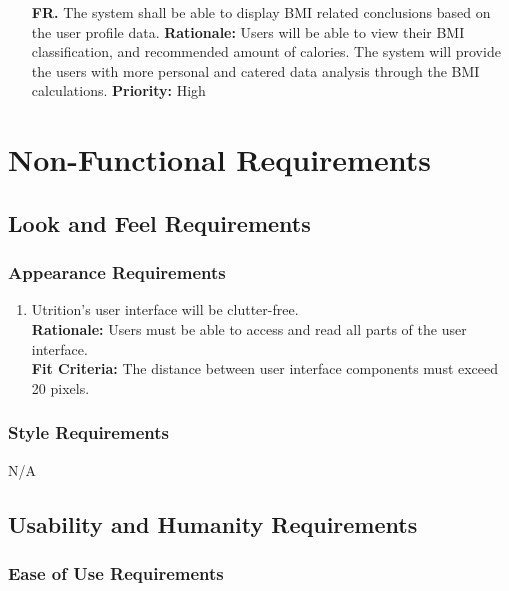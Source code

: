 \documentclass[12pt]{article}
\newcounter{FRCounter}
\newcommand{\FillFRNumber}{\textbf{FR\arabic{FRCounter}.} \stepcounter{FRCounter}}
\begin{document}
\begin{itemize}
	\item [\FillFRNumber] The system shall be able to display BMI related conclusions based on the user profile data. \newline
	\textbf{Rationale:} Users will be able to view their BMI classification, and recommended amount of calories. The system will provide the users with more personal and catered data analysis through the BMI calculations. \newline
	\textbf{Priority:} High
\end{itemize}


\section{Non-Functional Requirements}

\subsection{Look and Feel Requirements}

\subsubsection{Appearance Requirements}

\begin{enumerate}[{LF}1. ]
	\item Utrition’s user interface will be clutter-free.\\
	\textbf{Rationale:} Users must be able to access and read all parts of the user interface. \\
	\textbf{Fit Criteria:} The distance between user interface components must exceed 20 pixels.
\end{enumerate}

\subsubsection{Style Requirements}
\hspace{1.5cm}N/A

\subsection{Usability and Humanity Requirements}

\subsubsection{Ease of Use Requirements}
\end{document}
